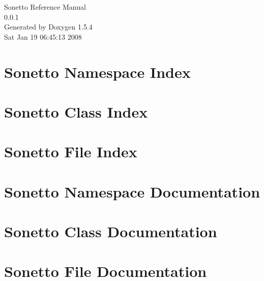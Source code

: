 \documentclass[a4paper]{book}
\begin{document}
\begin{titlepage}
\vspace*{7cm}
\begin{center}
{\Large Sonetto Reference Manual\\[1ex]\large 0.0.1 }\\
\vspace*{1cm}
{\large Generated by Doxygen 1.5.4}\\
\vspace*{0.5cm}
{\small Sat Jan 19 06:45:13 2008}\\
\end{center}
\end{titlepage}
\clearemptydoublepage
{}
\tableofcontents
\clearemptydoublepage
{}
\chapter{Sonetto Namespace Index}

\chapter{Sonetto Class Index}

\chapter{Sonetto File Index}

\chapter{Sonetto Namespace Documentation}


\chapter{Sonetto Class Documentation}



















\chapter{Sonetto File Documentation}










\printindex
\end{document}
